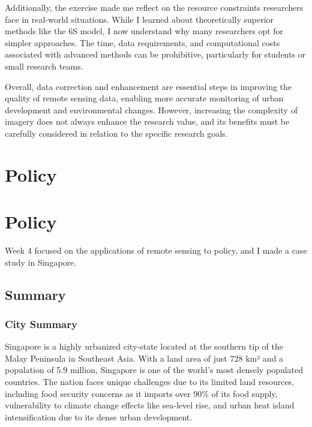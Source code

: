 \documentclass[
  letterpaper,
  DIV=11,
  numbers=noendperiod]{scrreprt}
\begin{document}
Additionally, the exercise made me reflect on the resource constraints
researchers face in real-world situations. While I learned about
theoretically superior methods like the 6S model, I now understand why
many researchers opt for simpler approaches. The time, data
requirements, and computational costs associated with advanced methods
can be prohibitive, particularly for students or small research teams.

Overall, data correction and enhancement are essential steps in
improving the quality of remote sensing data, enabling more accurate
monitoring of urban development and environmental changes. However,
increasing the complexity of imagery does not always enhance the
research value, and its benefits must be carefully considered in
relation to the specific research goals.


\chapter{Policy}\label{policy}


\chapter{Policy}\label{policy-1}

Week 4 focused on the applications of remote sensing to policy, and I
made a case study in Singapore.

\section{Summary}\label{summary-1}

\subsection{City Summary}\label{city-summary}

Singapore is a highly urbanized city-state located at the southern tip
of the Malay Peninsula in Southeast Asia. With a land area of just 728
km² and a population of 5.9 million, Singapore is one of the world's
most densely populated countries. The nation faces unique challenges due
to its limited land resources, including food security concerns as it
imports over 90\% of its food supply, vulnerability to climate change
effects like sea-level rise, and urban heat island intensification due
to its dense urban development.
\end{document}
